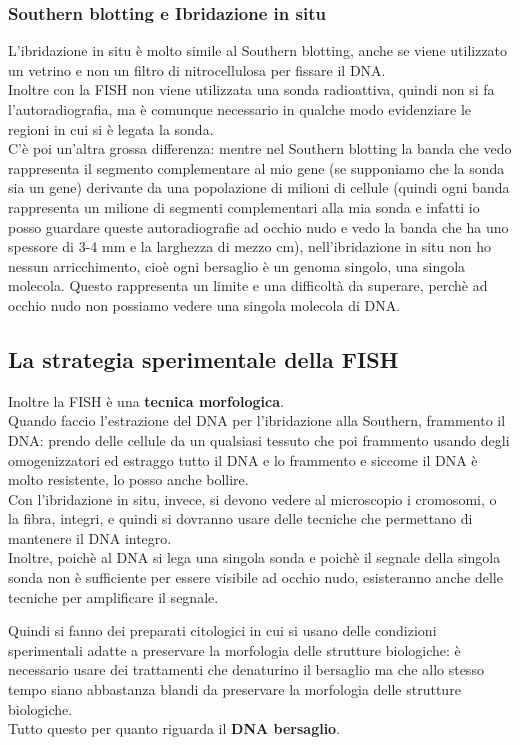 \documentclass[11pt]{book}
\begin{document}
\subsubsection{Southern blotting e Ibridazione in situ}
L’ibridazione in situ è molto simile al Southern blotting, anche se viene utilizzato un vetrino e non un filtro di nitrocellulosa per fissare il DNA.\\
Inoltre con la FISH non viene utilizzata una sonda radioattiva, quindi non si fa l'autoradiografia, ma è comunque necessario in qualche modo evidenziare le regioni in cui si è legata la sonda.\\
C'è poi un'altra grossa differenza: mentre nel Southern blotting la banda che vedo rappresenta il segmento complementare al mio gene (se supponiamo che la sonda sia un gene) derivante da una popolazione di milioni di cellule (quindi ogni banda rappresenta un milione di segmenti complementari alla mia sonda e infatti io posso guardare queste autoradiografie ad occhio nudo e vedo la banda che ha uno spessore di 3-4 mm e la larghezza di mezzo cm), nell'ibridazione in situ non ho nessun arricchimento, cioè ogni bersaglio è un genoma singolo, una singola molecola. Questo rappresenta un limite e una difficoltà da superare, perchè ad occhio nudo non possiamo vedere una singola molecola di DNA. 


\subsection{La strategia sperimentale della FISH}
Inoltre la FISH è una \textbf{tecnica morfologica}.\\
Quando faccio l’estrazione del DNA per l’ibridazione alla Southern, frammento il DNA: prendo delle cellule da un qualsiasi tessuto che poi frammento usando degli omogenizzatori ed estraggo tutto il DNA e lo frammento e siccome il DNA è molto resistente, lo posso anche bollire.\\
Con l’ibridazione in situ, invece, si devono vedere al microscopio i cromosomi, o la fibra, integri, e quindi si dovranno usare delle tecniche che permettano di mantenere il DNA integro.\\
Inoltre, poichè al DNA si lega una singola sonda e poichè il segnale della singola sonda non è sufficiente per essere visibile ad occhio nudo, esisteranno anche delle tecniche per amplificare il segnale.

Quindi si fanno dei preparati citologici in cui si usano delle condizioni sperimentali adatte a preservare la morfologia delle strutture biologiche: è necessario usare dei trattamenti che denaturino il bersaglio ma che allo stesso tempo siano abbastanza blandi da preservare la morfologia delle strutture biologiche.\\
Tutto questo per quanto riguarda il \textbf{DNA bersaglio}.
\end{document}
